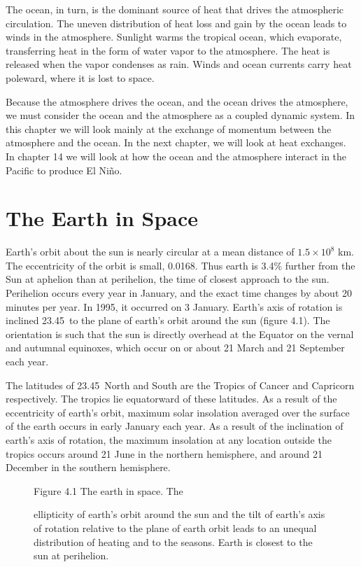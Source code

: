 The ocean, in turn, is the dominant source of heat that drives the atmospheric circulation. The uneven distribution of heat loss and gain by the ocean leads to winds in the atmosphere.
Sunlight warms the tropical ocean, which evaporate, transferring heat in the
form of water vapor to the atmosphere. The heat is released when the vapor condenses as rain. Winds and ocean currents carry heat poleward,
where it is lost to space.

Because the atmosphere drives the ocean, and the ocean drives the
atmosphere, we must consider the ocean and the atmosphere as a coupled dynamic
system. In this chapter we will look mainly at the exchange of momentum between the
atmosphere and the ocean. In the next chapter, we will look at heat exchanges. In chapter 14 we
will look at how the ocean and the atmosphere interact in the Pacific to produce El
Ni\~{n}o.

\section{The Earth in Space}
Earth's orbit about the sun is nearly circular at a mean
distance of \(1.5 \times 10^8\) km. The eccentricity of the orbit is small, 0.0168.
Thus earth is 3.4\% further from the Sun at aphelion than at perihelion, the time
of closest approach to the sun. Perihelion occurs every year in January, and
the exact time changes by about 20 minutes per year. In 1995, it occurred on 3
January. Earth's axis of rotation is inclined 23.45\degrees\ to the plane of
earth's orbit around the sun (figure 4.1). The orientation is such that the
sun is directly overhead at the Equator on the vernal and autumnal
equinoxes, which occur on or about 21 March and 21 September each year.

The latitudes of 23.45\degrees\ North and South are the Tropics of Cancer
and Capricorn respectively. The tropics lie equatorward of these latitudes. As a
result of the eccentricity of earth's orbit, maximum solar insolation
averaged over the surface of the earth occurs in early January each year. As a result of the
inclination of earth's axis of rotation, the maximum insolation at any location
outside the tropics occurs around 21 June in the northern hemisphere, and around 21
December in the southern hemisphere.

\begin{figure}[t!]
\footnotesize
Figure 4.1 The earth in space. The \rule{0mm}{3ex}ellipticity of earth's orbit
around the sun and the tilt of earth's axis of rotation relative to the plane of
earth orbit leads to an unequal distribution of heating and to the seasons. Earth is closest
to the sun at perihelion.
\label{fig:earthinspace}
\vspace{-4ex}
\end{figure}

